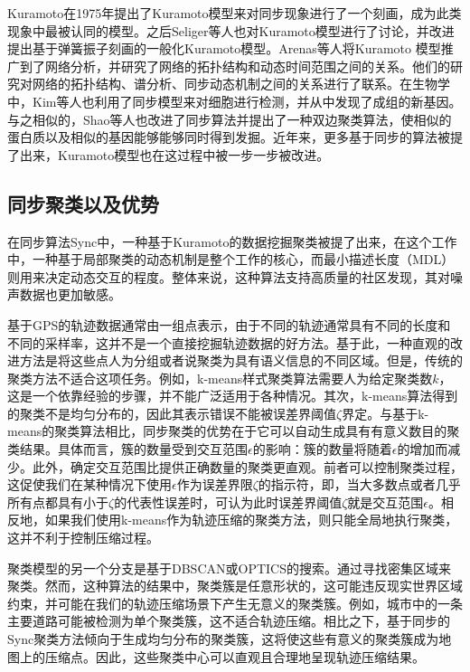 Kuramoto在1975年提出了Kuramoto模型来对同步现象进行了一个刻画，成为此类现象中最被认同的模型。之后Seliger等人也对Kuramoto模型进行了讨论，并改进提出基于弹簧振子刻画的一般化Kuramoto模型。Arenas等人将Kuramoto 模型推广到了网络分析，并研究了网络的拓扑结构和动态时间范围之间的关系。他们的研究对网络的拓扑结构、谱分析、同步动态机制之间的关系进行了联系。在生物学中，Kim等人也利用了同步模型来对细胞进行检测，并从中发现了成组的新基因。与之相似的，Shao等人也改进了同步算法并提出了一种双边聚类算法，使相似的蛋白质以及相似的基因能够能够同时得到发掘。近年来，更多基于同步的算法被提了出来，Kuramoto模型也在这过程中被一步一步被改进。


\subsection{同步聚类以及优势}
在同步算法Sync中，一种基于Kuramoto的数据挖掘聚类被提了出来，在这个工作中，一种基于局部聚类的动态机制是整个工作的核心，而最小描述长度（MDL）则用来决定动态交互的程度。整体来说，这种算法支持高质量的社区发现，其对噪声数据也更加敏感。

基于GPS的轨迹数据通常由一组点表示，由于不同的轨迹通常具有不同的长度和不同的采样率，这并不是一个直接挖掘轨迹数据的好方法。基于此，一种直观的改进方法是将这些点人为分组或者说聚类为具有语义信息的不同区域。但是，传统的聚类方法不适合这项任务。例如，k-means样式聚类算法需要人为给定聚类数$k$，这是一个依靠经验的步骤，并不能广泛适用于各种情况。其次，k-means算法得到的聚类不是均匀分布的，因此其表示错误不能被误差界阈值$\zeta$界定。与基于k-means的聚类算法相比，同步聚类的优势在于它可以自动生成具有有意义数目的聚类结果。具体而言，簇的数量受到交互范围$\epsilon$的影响：簇的数量将随着$\epsilon$的增加而减少。此外，确定交互范围比提供正确数量的聚类更直观。前者可以控制聚类过程，这促使我们在某种情况下使用$\epsilon$作为误差界限$\zeta$的指示符，即，当大多数点或者几乎所有点都具有小于$\zeta$的代表性误差时，可认为此时误差界阈值$\zeta$就是交互范围$\epsilon$。相反地，如果我们使用k-means作为轨迹压缩的聚类方法，则只能全局地执行聚类，这并不利于控制压缩过程。

聚类模型的另一个分支是基于DBSCAN或OPTICS的搜索。通过寻找密集区域来聚类。然而，这种算法的结果中，聚类簇是任意形状的，这可能违反现实世界区域约束，并可能在我们的轨迹压缩场景下产生无意义的聚类簇。例如，城市中的一条主要道路可能被检测为单个聚类簇，这不适合轨迹压缩。相比之下，基于同步的Sync聚类方法倾向于生成均匀分布的聚类簇，这将使这些有意义的聚类簇成为地图上的压缩点。因此，这些聚类中心可以直观且合理地呈现轨迹压缩结果。


